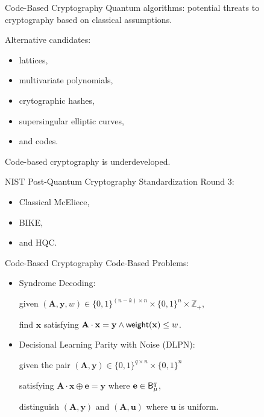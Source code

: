\begin{frame}{Code-Based Cryptography}
	Quantum algorithms: potential threats to cryptography based on classical assumptions.
	
	Alternative candidates: 
	\begin{itemize}
		\item lattices, 
		\item multivariate polynomials, 
		\item crytographic hashes, 
		\item supersingular elliptic curves, 
		\item and codes.
	\end{itemize}

	Code-based cryptography is underdeveloped.
	
	NIST Post-Quantum Cryptography Standardization Round 3: 
	\begin{itemize}
		\item Classical McEliece, 
		\item BIKE,
		\item and HQC.
	\end{itemize}
\end{frame}

\begin{frame}{Code-Based Cryptography}
	Code-Based Problems:
	\begin{itemize}
		\item Syndrome Decoding: 
		
		given $(\mathbf{A}, \mathbf{y}, w) \in \{0,1\}^{(n - k)\times n}\times \{0,1\}^n\times \mathbb{Z}_+$,
		
		find $\mathbf{x}$ satisfying $\mathbf{A}\cdot\mathbf{x} = \mathbf{y} \wedge \mathsf{weight}(\mathbf{x}) \leq w$.
		
		\item Decisional Learning Parity with Noise (DLPN):
		
		given the pair $(\mathbf{A}, \mathbf{y}) \in \{0,1\}^{q\times n}\times \{0,1\}^n$
		
		satisfying $\mathbf{A}\cdot\mathbf{x}\oplus \mathbf{e} = \mathbf{y}$ where $\mathbf{e} \in \mathsf{B}_\mu^q$,
		
		distinguish $(\mathbf{A}, \mathbf{y})$ and $(\mathbf{A}, \mathbf{u})$ where $\mathbf{u}$ is uniform.
	\end{itemize}
\end{frame}